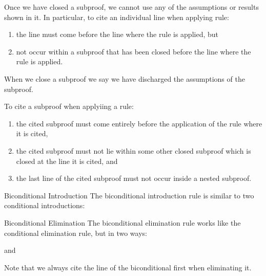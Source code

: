 \documentclass[12pt, a4paper, twoside, openright, titlepage]{book}
\begin{document}
\begin{rmk}{}{}
    Once we have closed a subproof, we cannot use any of the assumptions or results shown in it. In particular, to cite an individual line when applying rule: \begin{enumerate}
        \item the line must come before the line where the rule is applied, but
        \item not occur within a subproof that has been closed before the line where the rule is applied.
    \end{enumerate}
    When we close a subproof we say we have discharged the assumptions of the subproof.
\end{rmk}


\begin{rmk}{}{}
    To cite a subproof when applyiing a rule: \begin{enumerate}
        \item the cited subproof must come entirely before the application of the rule where it is cited,
        \item the cited subproof must not lie within some other closed subproof which is closed at the line it is cited, and 
        \item the last line of the cited subproof must not occur inside a nested subproof.
    \end{enumerate}
\end{rmk}

\begin{defn}{Biconditional Introduction}{}
    The biconditional introduction rule is similar to two conditional introductions: \begin{fitchproof}
        \open
        \close
        \open 
        \close
         
    \end{fitchproof}
\end{defn}

\begin{defn}{Biconditional Elimination}{}
    The biconditional elimination rule works like the conditional elimination rule, but in two ways: \begin{fitchproof}
         
    \end{fitchproof}
    and \begin{fitchproof}
         
    \end{fitchproof}
    Note that we always cite the line of the biconditional first when eliminating it.
\end{defn}
\end{document}
